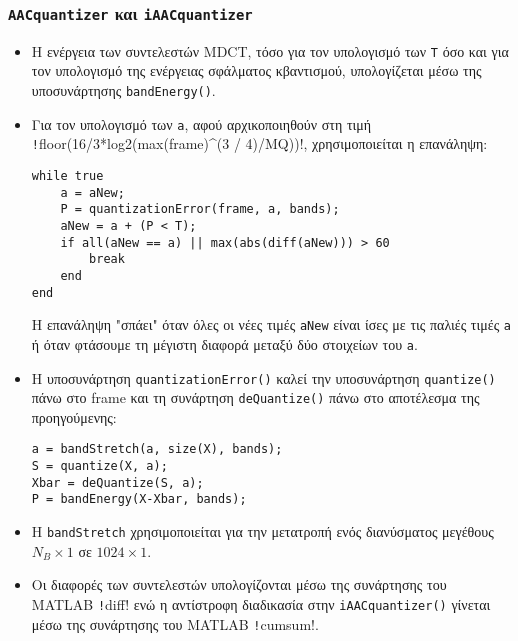\subsubsection{\texttt{AACquantizer} και \texttt{iAACquantizer}}
\begin{itemize}
\item Η ενέργεια των συντελεστών MDCT, τόσο για τον υπολογισμό των \texttt{T} όσο και για τον υπολογισμό της ενέργειας σφάλματος κβαντισμού, υπολογίζεται μέσω της υποσυνάρτησης \texttt{bandEnergy()}.

\item Για τον υπολογισμό των \texttt{a}, αφού αρχικοποιηθούν στη τιμή \texttt!floor(16/3*log2(max(frame)^(3 / 4)/MQ))!, χρησιμοποιείται η επανάληψη:
\begin{verbatim}
while true
    a = aNew;
    P = quantizationError(frame, a, bands);
    aNew = a + (P < T);
    if all(aNew == a) || max(abs(diff(aNew))) > 60
        break
    end
end
\end{verbatim}
Η επανάληψη "σπάει" όταν όλες οι νέες τιμές \texttt{aNew} είναι ίσες με τις παλιές τιμές \texttt{a} ή όταν φτάσουμε τη μέγιστη διαφορά μεταξύ δύο στοιχείων του \texttt{a}.

\item Η υποσυνάρτηση \texttt{quantizationError()} καλεί την υποσυνάρτηση \texttt{quantize()} πάνω στο frame και τη συνάρτηση \texttt{deQuantize()} πάνω στο αποτέλεσμα της προηγούμενης:
\begin{verbatim}
a = bandStretch(a, size(X), bands);
S = quantize(X, a);
Xbar = deQuantize(S, a);
P = bandEnergy(X-Xbar, bands);
\end{verbatim}

\item Η \texttt{bandStretch} χρησιμοποιείται για την μετατροπή ενός διανύσματος μεγέθους $N_B \times 1$ σε $1024 \times 1$.

\item Οι διαφορές των συντελεστών υπολογίζονται μέσω της συνάρτησης του MATLAB \texttt!diff! ενώ η αντίστροφη διαδικασία στην \texttt{iAACquantizer()} γίνεται μέσω της συνάρτησης του MATLAB \texttt!cumsum!.
\end{itemize}

